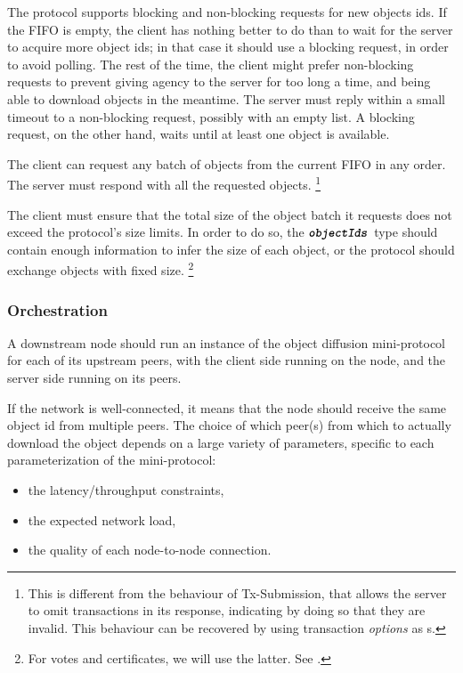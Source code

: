 The protocol supports blocking and non-blocking requests for new objects ids. If
the FIFO is empty, the client has nothing better to do than to wait for the
server to acquire more object ids; in that case it should use a blocking
request, in order to avoid polling. The rest of the time, the client might
prefer non-blocking requests to prevent giving agency to the server for too long
a time, and being able to download objects in the meantime. The server must
reply within a small timeout to a non-blocking request, possibly with an empty
list. A blocking request, on the other hand, waits until at least one object is
available.

The client can request any batch of objects from the current FIFO in any order.
The server must respond with all the requested objects.%
%
\footnote{This is different from the behaviour of Tx-Submission, that allows the
server to omit transactions in its response, indicating by doing so that they
are invalid. This behaviour can be recovered by using transaction {\em options}
as s.}

The client must ensure that the total size of the object batch it requests does not
exceed the protocol's size limits. In order to do so, the $\textbf{\texttt{\textit{objectIds}}}$ type
should contain enough information to infer the size of each object, or the protocol
should exchange objects with fixed size.%
%
\footnote{For votes and certificates, we will use the latter. See
.}

\subsubsection{Orchestration}

A downstream node should run an instance of the object diffusion mini-protocol
for each of its upstream peers, with the client side running on the node, and
the server side running on its peers.

If the network is well-connected, it means that the node should receive the same object id
from multiple peers. The choice of which peer(s) from which to actually download the object
depends on a large variety of parameters, specific to each parameterization of the mini-protocol:
\begin{itemize}
  \item the latency/throughput constraints,
  \item the expected network load,
  \item the quality of each node-to-node connection.
\end{itemize}

